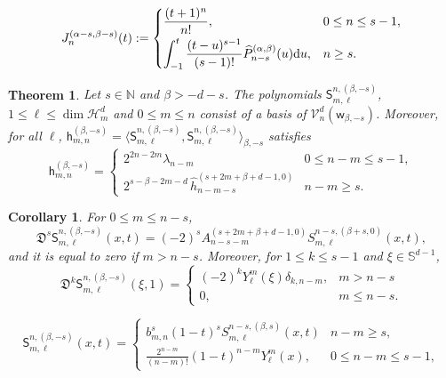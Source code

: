 \documentclass[10pt,a4paper]{amsart}
\newtheorem{thm}{Theorem}
\newtheorem{cor}{Corollary}
\def\CH{{\mathcal H}}
\def\CV{{\mathcal V}}
\def\NN{{\mathbb N}}
\def\a{{\alpha}}
\def\b{{\beta}}
\def\d{\mathrm{d}}
\def\fD{{\mathfrak D}}
\def\l{{\lambda}}
\def\sS{{\mathsf S}}
\def\sh{{\mathsf h}}
\def\sph{{\mathbb{S}^{d-1}}}
\def\sw{{\mathsf w}}
\newcommand{\wh}{\widehat}
\begin{document}
\begin{align} \label{eq:CJ}
\begin{split}
   J_n^{(\a-s,\b-s)}(t) := \begin{cases}  \dfrac{(t+1)^n}{n!}, & 0 \le n \le s-1, \vspace{.05in} \\
        \displaystyle{\int_{-1}^t \frac{(t-u)^{s-1}}{(s-1)!} \wh P_{n-s}^{(\a,\b)}(u) \d u}, & n \ge s.
   \end{cases}
\end{split}
\end{align}

\begin{thm} \label{thm:SOP-cone}
Let $s \in \NN$ and $\b > -d-s$. The polynomials $\sS_{m,\ell}^{n, (\b,-s)}$, $1 \le \ell \le \dim \CH_m^d$
and $0\le m \le n$ consist of a basis of $\CV_n^d(\sw_{\b,-s})$. Moreover, for all $\ell$, $\sh_{m,n}^{(\b,-s)}  =
\langle \sS_{m,\ell}^{n, (\b,-s)}, \sS_{m,\ell}^{n, (\b,-s)} \rangle_{\b,-s}$ satisfies
$$
 \sh_{m,n}^{(\b,-s)}   = \begin{cases}2^{2n-2m} \l_{n-m} &  0 \le n -m \le s-1, \\
      2^{s - \b-2m-d}\, \wh h_{n-m-s}^{(s+2m+\b+d-1,0)} & n-m \ge s. \end{cases}
$$
\end{thm}

\begin{cor}\label{cor:der_sS}
For $0 \le m \le n-s$,
\begin{equation} \label{eq:D_sS}
 \fD^s \sS_{m,\ell}^{n, (\b,-s)}(x,t) = (-2)^s A_{n-s-m}^{(s+2m+\b+d-1,0)} S_{m,\ell}^{n-s, (\b+s,0)}(x,t),
\end{equation}
and it is equal to zero if $m > n-s$. Moreover, for $1 \le k \le s-1$ and $\xi \in \sph$,
\begin{equation} \label{eq:D_sS2}
    \fD^k  \sS_{m,\ell}^{n, (\b,-s)}(\xi,1) = \begin{cases}
         (-2)^k Y_\ell^m(\xi) \delta_{k,n-m}, & m > n-s \\
         0, & m \le n-s.
     \end{cases}
\end{equation}
\end{cor}

\begin{equation}\label{eq:sS-explicit}
   \sS_{m,\ell}^{n,(\b,-s)}(x,t) = \begin{cases} b_{m,n}^s  (1- t)^s S_{m,\ell}^{n-s,(\b,s)}(x,t) & n-m \ge s, \\
           \frac{2^{n-m}}{(n-m)!}  (1-t)^{n-m} Y_\ell^m(x), &  0 \le n-m\le s-1,
\end{cases}
\end{equation}
\end{document}
